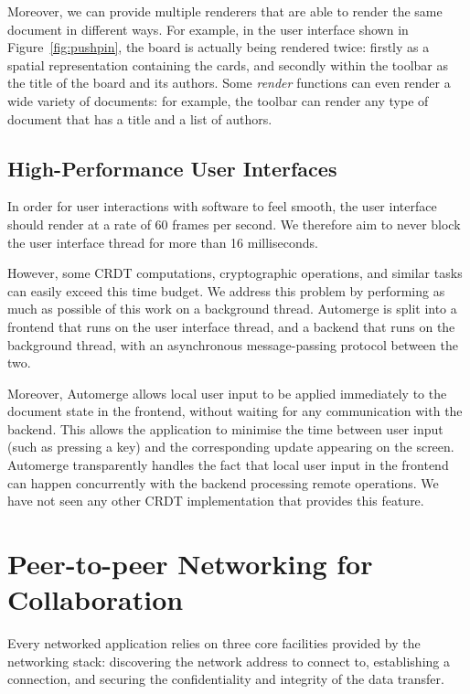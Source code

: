 \documentclass[sigplan,10pt]{acmart}
\begin{document}
Moreover, we can provide multiple renderers that are able to render the same document in different ways.
For example, in the user interface shown in Figure~\ref{fig:pushpin}, the board is actually being rendered twice: firstly as a spatial representation containing the cards, and secondly within the toolbar as the title of the board and its authors. Some \emph{render} functions can even render a wide variety of documents: for example, the toolbar can render any type of document that has a title and a list of authors.

\subsection{High-Performance User Interfaces}

In order for user interactions with software to feel smooth, the user interface should render at a rate of 60 frames per second.
We therefore aim to never block the user interface thread for more than 16 milliseconds.

However, some CRDT computations, cryptographic operations, and similar tasks can easily exceed this time budget.
We address this problem by performing as much as possible of this work on a background thread.
Automerge is split into a frontend that runs on the user interface thread, and a backend that runs on the background thread, with an asynchronous message-passing protocol between the two.

Moreover, Automerge allows local user input to be applied immediately to the document state in the frontend, without waiting for any communication with the backend.
This allows the application to minimise the time between user input (such as pressing a key) and the corresponding update appearing on the screen.
Automerge transparently handles the fact that local user input in the frontend can happen concurrently with the backend processing remote operations.
We have not seen any other CRDT implementation that provides this feature.

\section{Peer-to-peer Networking for Collaboration}\label{sec:networking}

Every networked application relies on three core facilities provided by the networking stack: discovering the network address to connect to, establishing a connection, and securing the confidentiality and integrity of the data transfer.
\end{document}
